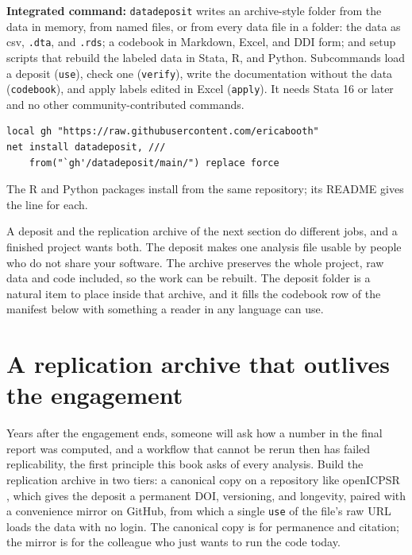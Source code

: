 \begin{kaobox}[frametitle=Package Integration: \texttt{datadeposit}]
\textbf{Integrated command:} \texttt{datadeposit} writes an archive-style folder from the data in memory, from named files, or from every data file in a folder: the data as csv, \texttt{.dta}, and \texttt{.rds}; a codebook in Markdown, Excel, and DDI form; and setup scripts that rebuild the labeled data in Stata, R, and Python. Subcommands load a deposit (\texttt{use}), check one (\texttt{verify}), write the documentation without the data (\texttt{codebook}), and apply labels edited in Excel (\texttt{apply}). It needs Stata 16 or later and no other community-contributed commands.
\par
{\footnotesize
\begin{verbatim}
local gh "https://raw.githubusercontent.com/ericabooth"
net install datadeposit, ///
    from("`gh'/datadeposit/main/") replace force
\end{verbatim}
}
The R and Python packages install from the same repository; its README gives the line for each.
\end{kaobox}

A deposit and the replication archive of the next section do different jobs, and a finished project wants both. The deposit makes one analysis file usable by people who do not share your software. The archive preserves the whole project, raw data and code included, so the work can be rebuilt. The deposit folder is a natural item to place inside that archive, and it fills the codebook row of the manifest below with something a reader in any language can use.

\section{A replication archive that outlives the engagement}\label{sec:archive}
Years after the engagement ends, someone will ask how a number in the final report was computed, and a workflow that cannot be rerun then has failed replicability, the first principle this book asks of every analysis. Build the replication archive in two tiers: a canonical copy on a repository like openICPSR \parencite{openicpsr}, which gives the deposit a permanent DOI, versioning, and longevity, paired with a convenience mirror on GitHub, from which a single \texttt{use} of the file's raw URL loads the data with no login. The canonical copy is for permanence and citation; the mirror is for the colleague who just wants to run the code today.

